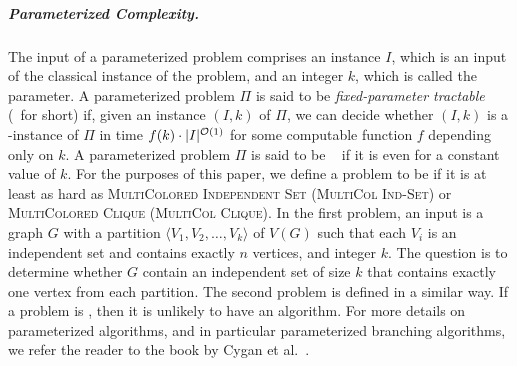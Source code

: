 

\subparagraph*{Parameterized Complexity.}
The input of a parameterized problem comprises an instance $I$,
which is an input of the classical instance of the problem,
and an integer $k$, which is called the parameter.
A parameterized problem $\Pi$ is said to be \emph{fixed-parameter tractable} (\FPT\ for short) %
if, given an instance $(I,k)$ of $\Pi$,
we can decide whether $(I,k)$ is a \yes-instance of $\Pi$
in time $f(k)\cdot |I|^{\mathcal{O}(1)}$
for some computable function $f$ depending only on $k$.
A parameterized problem $\Pi$ is said to be \para\NPH\ %
if it is \NPH even for a constant value of $k$. 
For the purposes of this paper, we define a problem to be 
\WoneH if it is at least as hard as 
\textsc{MultiColored Independent Set (MultiCol Ind-Set)}
or \textsc{MultiColored Clique (MultiCol Clique)}.
In the first problem, an input is a graph $G$ with a 
partition $\langle V_1,V_2,\ldots,V_k\rangle$ of $V(G)$ such that each $V_i$ 
is an independent set and contains exactly $n$ vertices, and integer $k$.
The question is to determine whether $G$ contain 
an independent set of size $k$ that contains exactly one vertex from 
each partition.
The second problem is defined in a similar way.
If a problem is \WoneH, then it is unlikely to have an \FPT algorithm.
For more details on parameterized algorithms, and in particular parameterized branching algorithms,
we refer the reader to the book by Cygan et al.~\cite{DBLP:books/sp/CyganFKLMPPS15}.


